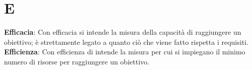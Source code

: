 \section*{E}
\textbf{Efficacia}: Con efficacia si intende la misura della capacità di raggiungere un obiettivo; è strettamente
legato a quanto ciò che viene fatto rispetta i requisiti.\\
\textbf{Efficienza}: Con efficienza di intende la misura per cui si impiegano il minimo numero di risorse per
raggiungere un obiettivo.\\
